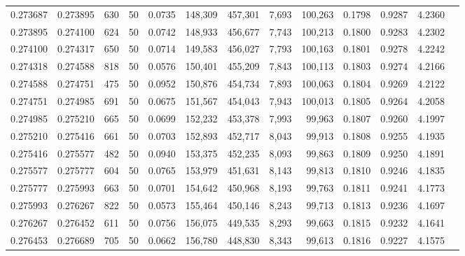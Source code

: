 \begin{tabular}{rrrrrrrrrrrrr}
0.273687 & 0.273895 &   630 &  50 &                                     0.0735 & 148,309 & 457,301 &   7,693 & 100,263 & 0.1798 & 0.9287 & 4.2360 \\
0.273895 & 0.274100 &   624 &  50 &                                     0.0742 & 148,933 & 456,677 &   7,743 & 100,213 & 0.1800 & 0.9283 & 4.2302 \\
0.274100 & 0.274317 &   650 &  50 &                                     0.0714 & 149,583 & 456,027 &   7,793 & 100,163 & 0.1801 & 0.9278 & 4.2242 \\
0.274318 & 0.274588 &   818 &  50 &                                     0.0576 & 150,401 & 455,209 &   7,843 & 100,113 & 0.1803 & 0.9274 & 4.2166 \\
0.274588 & 0.274751 &   475 &  50 &                                     0.0952 & 150,876 & 454,734 &   7,893 & 100,063 & 0.1804 & 0.9269 & 4.2122 \\
0.274751 & 0.274985 &   691 &  50 &                                     0.0675 & 151,567 & 454,043 &   7,943 & 100,013 & 0.1805 & 0.9264 & 4.2058 \\
0.274985 & 0.275210 &   665 &  50 &                                     0.0699 & 152,232 & 453,378 &   7,993 &  99,963 & 0.1807 & 0.9260 & 4.1997 \\
0.275210 & 0.275416 &   661 &  50 &                                     0.0703 & 152,893 & 452,717 &   8,043 &  99,913 & 0.1808 & 0.9255 & 4.1935 \\
0.275416 & 0.275577 &   482 &  50 &                                     0.0940 & 153,375 & 452,235 &   8,093 &  99,863 & 0.1809 & 0.9250 & 4.1891 \\
0.275577 & 0.275777 &   604 &  50 &                                     0.0765 & 153,979 & 451,631 &   8,143 &  99,813 & 0.1810 & 0.9246 & 4.1835 \\
0.275777 & 0.275993 &   663 &  50 &                                     0.0701 & 154,642 & 450,968 &   8,193 &  99,763 & 0.1811 & 0.9241 & 4.1773 \\
0.275993 & 0.276267 &   822 &  50 &                                     0.0573 & 155,464 & 450,146 &   8,243 &  99,713 & 0.1813 & 0.9236 & 4.1697 \\
0.276267 & 0.276452 &   611 &  50 &                                     0.0756 & 156,075 & 449,535 &   8,293 &  99,663 & 0.1815 & 0.9232 & 4.1641 \\
0.276453 & 0.276689 &   705 &  50 &                                     0.0662 & 156,780 & 448,830 &   8,343 &  99,613 & 0.1816 & 0.9227 & 4.1575 \\

\end{tabular}
